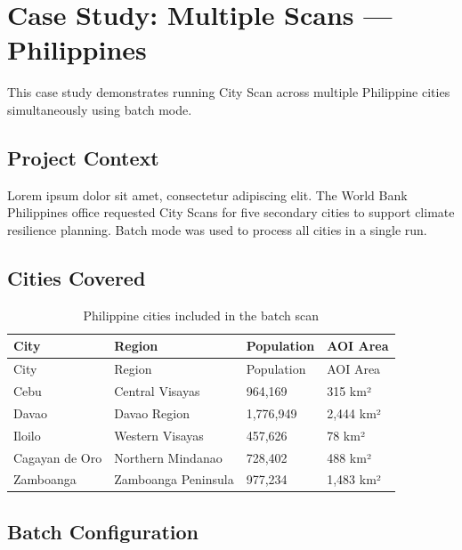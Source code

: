 \documentclass[
  letterpaper,
  DIV=11,
  numbers=noendperiod]{scrreprt}
\begin{document}
\chapter{Case Study: Multiple Scans ---
Philippines}\label{case-study-multiple-scans-philippines}

This case study demonstrates running City Scan across multiple
Philippine cities simultaneously using batch mode.

\section{Project Context}\label{project-context}

Lorem ipsum dolor sit amet, consectetur adipiscing elit. The World Bank
Philippines office requested City Scans for five secondary cities to
support climate resilience planning. Batch mode was used to process all
cities in a single run.

\section{Cities Covered}\label{cities-covered}

\begin{longtable}[]{@{}llll@{}}
\caption{Philippine cities included in the batch
scan}\label{tbl-ph-cities}\tabularnewline
\toprule\noalign{}
City & Region & Population & AOI Area \\
\midrule\noalign{}
\endfirsthead
\toprule\noalign{}
City & Region & Population & AOI Area \\
\midrule\noalign{}
\endhead
\bottomrule\noalign{}
\endlastfoot
Cebu & Central Visayas & 964,169 & 315 km² \\
Davao & Davao Region & 1,776,949 & 2,444 km² \\
Iloilo & Western Visayas & 457,626 & 78 km² \\
Cagayan de Oro & Northern Mindanao & 728,402 & 488 km² \\
Zamboanga & Zamboanga Peninsula & 977,234 & 1,483 km² \\
\end{longtable}

\section{Batch Configuration}\label{batch-configuration-1}
\end{document}
